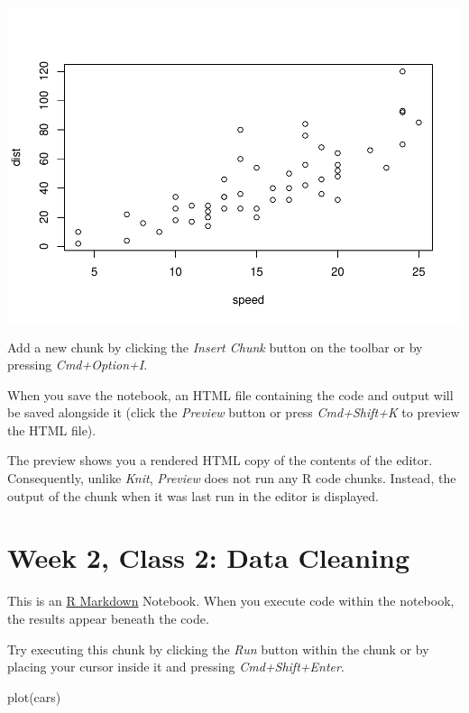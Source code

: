 \documentclass[
]{book}
\newenvironment{Shaded}{\begin{snugshade}}{\end{snugshade}}
\newcommand{\FunctionTok}[1]{\textcolor[rgb]{0.00,0.00,0.00}{#1}}
\newcommand{\NormalTok}[1]{#1}
\begin{document}
\includegraphics{_main_files/figure-latex/unnamed-chunk-29-1.pdf}

Add a new chunk by clicking the \emph{Insert Chunk} button on the toolbar or by pressing \emph{Cmd+Option+I}.

When you save the notebook, an HTML file containing the code and output will be saved alongside it (click the \emph{Preview} button or press \emph{Cmd+Shift+K} to preview the HTML file).

The preview shows you a rendered HTML copy of the contents of the editor. Consequently, unlike \emph{Knit}, \emph{Preview} does not run any R code chunks. Instead, the output of the chunk when it was last run in the editor is displayed.

\hypertarget{week-2-class-2-data-cleaning}{%
\chapter{Week 2, Class 2: Data Cleaning}\label{week-2-class-2-data-cleaning}}

This is an \href{http://rmarkdown.rstudio.com}{R Markdown} Notebook. When you execute code within the notebook, the results appear beneath the code.

Try executing this chunk by clicking the \emph{Run} button within the chunk or by placing your cursor inside it and pressing \emph{Cmd+Shift+Enter}.

\begin{Shaded}
\begin{Highlighting}[]
\FunctionTok{plot}\NormalTok{(cars)}
\end{Highlighting}
\end{Shaded}
\end{document}
